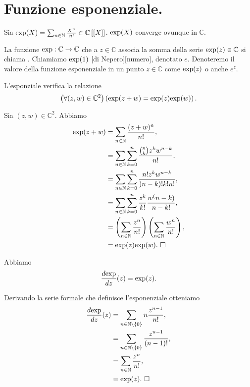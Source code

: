 \section{Funzione esponenziale.}
\label{FunzioniNotevoli_FunzioneEsponenziale}
\begin{Theorem}
	Sia
  $\text{exp}(X) =
  \sum_{n \in \mathbb{N}} \frac{X^n}{n!}
  \in \mathbb{C} \left [ \left [ X \right ] \right ]$. 
  $\text{exp}(X)$ converge ovunque in $\mathbb{C}$.
\end{Theorem}
\begin{Definition}
	La funzione $\text{exp}: \mathbb{C} \rightarrow \mathbb{C}$ che a
  $z \in \mathbb{C}$ associa la somma della serie
  $\text{exp}(z) \in \mathbb{C}$ si chiama
  .
  Chiamiamo $\text{exp}(1)$
  [di Nepero][numero],
  denotato $e$.
  Denoteremo il valore della funzione esponenziale in un punto
  $z \in \mathbb{C}$ come $\text{exp}(z)$ o anche $e^z$.
\end{Definition}
\begin{Theorem}
	L'esponziale verifica la relazione
	\[
		\left ( \forall (z,w) \in \mathbb{C}^2 \right ) \left ( \text{exp}(z + w) = \text{exp}(z)\text{exp}(w) \right ).
	\]
\end{Theorem}
\Proof Sia $(z,w) \in \mathbb{C}^2$. Abbiamo
\begin{align*}
	\text{exp}(z + w)
	&= \sum_{n \in \mathbb{N}} \frac{(z + w)^n}{n!},\\
	&= \sum_{n \in \mathbb{N}} \sum_{k = 0}^n \frac{\binom{n}{k} z^k w^{n - k}}{n!},\\
	&= \sum_{n \in \mathbb{N}} \sum_{k = 0}^n \frac{n! z^k w^{n - k}}{)n - k)!k!n!},\\
	&= \sum_{n \in \mathbb{N}} \sum_{k = 0}^n \frac{z^k}{k!} \frac{w^(n - k)}{n - k!},\\
	&= \left ( \sum_{n \in \mathbb{N}} \frac{z^n}{n!} \right ) \left ( \sum_{n \in \mathbb{N}} \frac{w^n}{n!} \right ),\\
	&= \text{exp}(z)\text{exp}(w).\text{ $\square$}
\end{align*}
\begin{Theorem}
  Abbiamo
  \[
    \frac{d\text{exp}}{dz}(z) = \text{exp}(z).
  \]
\end{Theorem}
\Proof Derivando la serie formale che definisce l'esponenziale otteniamo
\begin{align*}
  \frac{d\text{exp}}{dz}(z)
    &= \sum_{n \in \mathbb{N} \setminus \lbrace 0 \rbrace} n \frac{z^{n - 1}}{n!},\\
    &= \sum_{n \in \mathbb{N} \setminus \lbrace 0 \rbrace} \frac{z^{n - 1}}{(n - 1)!},\\
    &= \sum_{n \in \mathbb{N}} \frac{z^n}{n!},\\
    &= \text{exp}(z).\text{ $\square$}
\end{align*}
